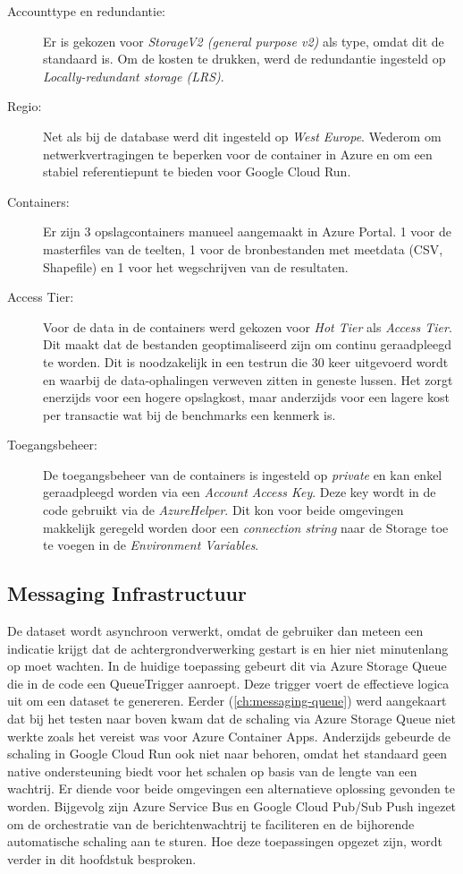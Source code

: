 \begin{description}
    \item[Accounttype en redundantie:]
     Er is gekozen voor \textit{StorageV2 (general purpose v2)} als type, omdat dit de standaard is. Om de kosten te drukken, werd de redundantie ingesteld op \textit{Locally-redundant storage (LRS)}.
     \item[Regio:]
     Net als bij de database werd dit ingesteld op \textit{West Europe}. Wederom om netwerkvertragingen te beperken voor de container in Azure en om een stabiel referentiepunt te bieden voor Google Cloud Run.
     \item[Containers:]
     Er zijn 3 opslagcontainers manueel aangemaakt in Azure Portal. 1 voor de masterfiles van de teelten, 1 voor de bronbestanden met meetdata (CSV, Shapefile) en 1 voor het wegschrijven van de resultaten.
     \item[Access Tier:]
     Voor de data in de containers werd gekozen voor \textit{Hot Tier} als \textit{Access Tier}. Dit maakt dat de bestanden geoptimaliseerd zijn om continu geraadpleegd te worden. Dit is noodzakelijk in een testrun die 30 keer uitgevoerd wordt en waarbij de data-ophalingen verweven zitten in geneste lussen. Het zorgt enerzijds voor een hogere opslagkost, maar anderzijds voor een lagere kost per transactie wat bij de benchmarks een kenmerk is.
     \item[Toegangsbeheer:]
     De toegangsbeheer van de containers is ingesteld op \textit{private} en kan enkel geraadpleegd worden via een \textit{Account Access Key}. Deze key wordt in de code gebruikt via de \textit{AzureHelper}. Dit kon voor beide omgevingen makkelijk geregeld worden door een \textit{connection string} naar de Storage toe te voegen in de \textit{Environment Variables}.
\end{description}

\subsection{Messaging Infrastructuur}

De dataset wordt asynchroon verwerkt, omdat de gebruiker dan meteen een indicatie krijgt dat de achtergrondverwerking gestart is en hier niet minutenlang op moet wachten. In de huidige toepassing gebeurt dit via Azure Storage Queue die in de code een QueueTrigger aanroept. Deze trigger voert de effectieve logica uit om een dataset te genereren. Eerder (\ref{ch:messaging-queue}) werd aangekaart dat bij het testen naar boven kwam dat de schaling via Azure Storage Queue niet werkte zoals het vereist was voor Azure Container Apps. Anderzijds gebeurde de schaling in Google Cloud Run ook niet naar behoren, omdat het standaard geen native ondersteuning biedt voor het schalen op basis van de lengte van een wachtrij. Er diende voor beide omgevingen een alternatieve oplossing gevonden te worden. Bijgevolg zijn Azure Service Bus en Google Cloud Pub/Sub Push ingezet om de orchestratie van de berichtenwachtrij te faciliteren en de bijhorende automatische schaling aan te sturen. Hoe deze toepassingen opgezet zijn, wordt verder in dit hoofdstuk besproken.

